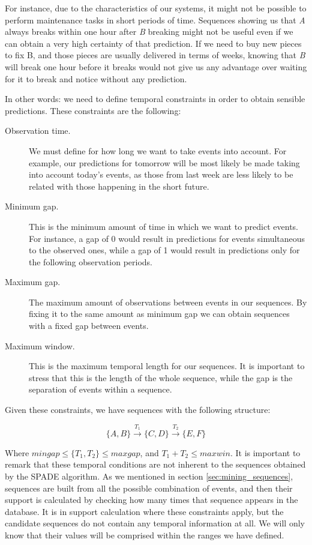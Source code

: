 \documentclass[a4paper,12pt]{article}
\begin{document}
For instance, due to the characteristics of our systems, it might not be possible to perform maintenance tasks in short periods of time. Sequences showing us that \emph{A} always breaks within one hour after \emph{B} breaking might not be useful even if we can obtain a very high certainty of that prediction. If we need to buy new pieces to fix B, and those pieces are usually delivered in terms of weeks, knowing that \emph{B} will break one hour before it breaks would not give us any advantage over waiting for it to break and notice without any prediction.

In other words: we need to define temporal constraints in order to obtain sensible predictions\cite{zaki2000cspade}. These constraints are the following:

\begin{description}
\item[Observation time.] We must define for how long we want to take events into account. For example, our predictions for tomorrow will be most likely be made taking into account today's events, as those from last week are less likely to be related with those happening in the short future.
\item[Minimum gap.] This is the minimum amount of time in which we want to predict events. For instance, a gap of 0 would result in predictions for events simultaneous to the observed ones, while a gap of 1 would result in predictions only for the following observation periods.
\item[Maximum gap.] The maximum amount of observations between events in our sequences. By fixing it to the same amount as minimum gap we can obtain sequences with a fixed gap between events.
\item[Maximum window.] This is the maximum temporal length for our sequences. It is important to stress that this is the length of the whole sequence, while the gap is the separation of events within a sequence.
\end{description}

Given these constraints, we have sequences with the following structure:

$$\{A, B\} \xrightarrow{T_1} \{C, D\} \xrightarrow{T_2} \{E, F\}$$

Where $mingap \leq \{T_1, T_2\} \leq maxgap$, and $T_1+T_2 \leq maxwin$. It is important to remark that these temporal conditions are not inherent to the sequences obtained by the SPADE algorithm. As we mentioned in section \ref{sec:mining_sequences}, sequences are built from all the possible combination of events, and then their support is calculated by checking how many times that sequence appears in the database. It is in support calculation where these constraints apply, but the candidate sequences do not contain any temporal information at all. We will only know that their values will be comprised within the ranges we have defined.
\end{document}
